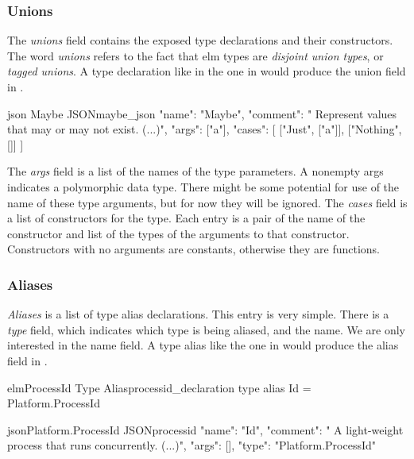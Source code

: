 \documentclass[../thesis.tex]{subfiles}
\begin{document}
\subsubsection{Unions}\label{unions}
The \textit{unions} field contains the exposed type declarations and their constructors.
The word \textit{unions} refers to the fact that elm types are \textit{disjoint union types}, or \textit{tagged unions}.
A type declaration like in the one in  would produce the union field in .
\begin{code}{ json }{Maybe JSON}{maybe_json}
{
  "name": "Maybe",
  "comment": " Represent values that may or may not exist. (...)",
  "args": ["a"],
  "cases": [
    ["Just", ["a"]],
    ["Nothing", []]
  ]
}
\end{code}
The \textit{args} field is a list of the names of the type parameters.
A nonempty args indicates a polymorphic data type.
There might be some potential for use of the name of these type arguments, but for now they will be ignored.
The \textit{cases} field is a list of constructors for the type.
Each entry is a pair of the name of the constructor and list of the types of the arguments to that constructor.
Constructors with no arguments are constants, otherwise they are functions.

\subsubsection{Aliases}\label{aliases}
\textit{Aliases} is a list of type alias declarations.
This entry is very simple.
There is a \textit{type} field, which indicates which type is being aliased, and the name.
We are only interested in the name field.
A type alias like the one in 
would produce the alias field in .

\begin{code}{elm}{ProcessId Type Alias}{processid_declaration}
type alias Id = Platform.ProcessId
\end{code}


\begin{code}{json}{Platform.ProcessId JSON}{processid}
{
  "name": "Id",
  "comment": " A light-weight process that runs concurrently. (...)",
  "args": [],
  "type": "Platform.ProcessId"
}
\end{code}
\end{document}
